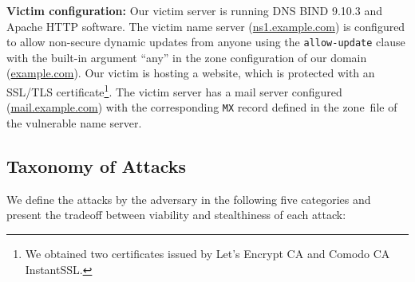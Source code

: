 
\textbf{Victim configuration:} Our victim server is running DNS BIND 9.10.3 and Apache HTTP software. 
The victim name server (\url{ns1.example.com}) is configured to allow non-secure dynamic updates %
from anyone using the \texttt{allow-update} clause with the built-in argument ``any'' in the zone configuration of our domain (\url{example.com}). %
%
Our victim is hosting a website, 
which is protected with an SSL/TLS certificate\footnote{We obtained two certificates issued by Let's Encrypt CA and Comodo CA InstantSSL.}. 
The victim server %
has a mail server configured (\url{mail.example.com}) with the corresponding \texttt{MX} record defined in the zone~file of the vulnerable name server.  


\subsection{Taxonomy of Attacks}
We define the attacks by the adversary in the following five categories and present the tradeoff between viability and stealthiness of each attack:


